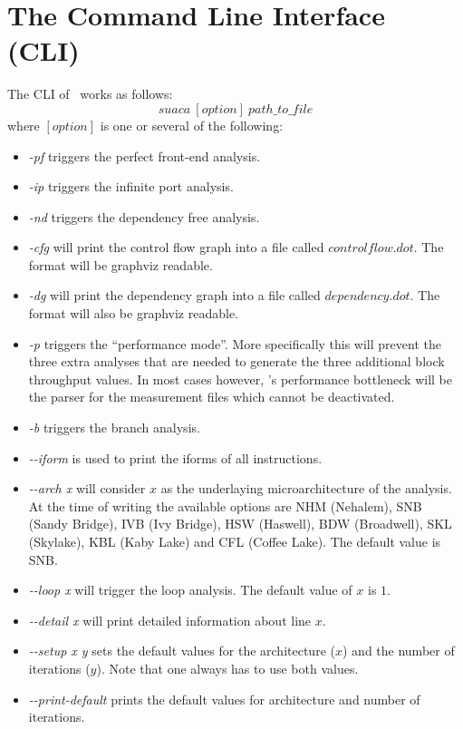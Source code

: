 \section{The Command Line Interface (CLI)}
The CLI of \suaca\ works as follows:\\
\[
suaca\ [option]\ path\_to\_file
\]
where $[option]$ is one or several of the following:
\begin{itemize}
    \item \emph{-pf} triggers the perfect front-end analysis.
    \item \emph{-ip} triggers the infinite port analysis.
    \item \emph{-nd} triggers the dependency free analysis. 
    \item \emph{-cfg} will print the control flow graph into a file called $controlflow.dot$. The format will be graphviz readable.
    \item \emph{-dg} will print the dependency graph into a file called $dependency.dot$. The format will also be graphviz readable.
    \item \emph{-p} triggers the ``performance mode''. More specifically this will prevent the three extra analyses that are needed to generate the three additional block throughput values. In most cases however, \suaca's performance bottleneck will be the parser for the measurement files which cannot be deactivated. 
    \item \emph{-b} triggers the branch analysis.
    \item \emph{-{}-iform} is used to print the iforms of all instructions.
    \item \emph{-{}-arch x} will consider $x$ as the underlaying microarchitecture of the analysis. At the time of writing the available options are NHM (Nehalem), SNB (Sandy Bridge), IVB (Ivy Bridge), HSW (Haswell), BDW (Broadwell), SKL (Skylake), KBL (Kaby Lake) and CFL (Coffee Lake). The default value is SNB.
    \item \emph{-{}-loop x} will trigger the loop analysis. The default value of $x$ is $1$.
    \item \emph{-{}-detail x} will print detailed information about line $x$.
     \item \emph{-{}-setup x y} sets the default values for the architecture ($x$) and the number of iterations ($y$). Note that one always has to use both values. 
    \item \emph{-{}-print-default} prints the default values for architecture and number of iterations.
\end{itemize}



